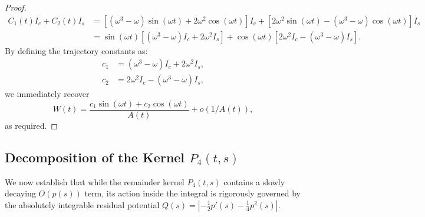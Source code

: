 \documentclass[10pt,reqno]{amsart}
\theoremstyle{definition}
\begin{document}
\begin{proof}
	\begin{align*}
		C_1(t) I_c + C_2(t) I_s &= [(\omega^3 - \omega)\sin(\omega t) + 2\omega^2\cos(\omega t)] I_c + [2\omega^2\sin(\omega t) - (\omega^3 - \omega)\cos(\omega t)] I_s \\
		&= \sin(\omega t) \left[ (\omega^3 - \omega)I_c + 2\omega^2 I_s \right] + \cos(\omega t) \left[ 2\omega^2 I_c - (\omega^3 - \omega)I_s \right].
	\end{align*}
	By defining the trajectory constants as:
	\begin{align*}
		c_1 &= (\omega^3 - \omega)I_c + 2\omega^2 I_s, \\
		c_2 &= 2\omega^2 I_c - (\omega^3 - \omega)I_s,
	\end{align*}
	we immediately recover $$W(t) = \frac{c_1 \sin(\omega t) + c_2 \cos(\omega t)}{A(t)} + o(1/A(t)),$$
	as required.
	\end{proof}
	
	 
	
	\subsection{Decomposition of the Kernel $P_4(t, s)$}
	
	We now establish that while the remainder kernel $P_4(t, s)$ contains a slowly decaying $O(p(s))$ term, its action inside the integral is rigorously governed by the absolutely integrable residual potential $Q(s) = \left| -\frac{1}{2}p'(s) - \frac{1}{4}p^2(s) \right|$. 
	
\end{document}
